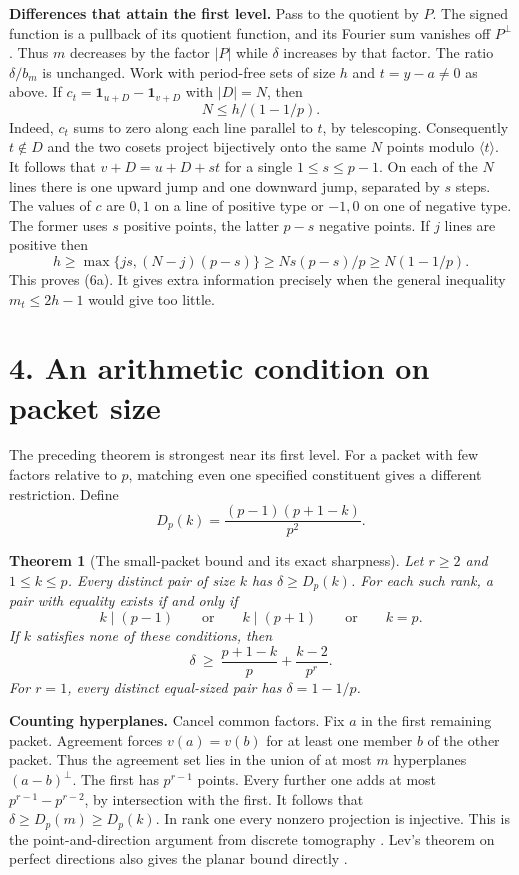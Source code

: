 \documentclass[11pt,letterpaper]{article}
\newcommand{\ind}{\mathbf 1}
\newtheorem{theorem}{Theorem}
\newcommand{\heading}[1]{\section*{\color{ink}#1}}
\newcommand{\subhead}[1]{\par\smallskip\noindent\textbf{#1.}\enspace}
\begin{document}
\subhead{Differences that attain the first level}
Pass to the quotient by $P$. The signed function is a pullback of its quotient function, and its Fourier sum vanishes off $P^\perp$. Thus $m$ decreases by the factor $|P|$ while $\delta$ increases by that factor. The ratio $\delta/b_m$ is unchanged. Work with period-free sets of size $h$ and $t=y-a\ne0$ as above. If $c_t=\ind_{u+D}-\ind_{v+D}$ with $|D|=N$, then
\[
                            N\le h/(1-1/p).                           \tag{6a}
\]
Indeed, $c_t$ sums to zero along each line parallel to $t$, by telescoping. Consequently $t\notin D$ and the two cosets project bijectively onto the same $N$ points modulo $\langle t\rangle$. It follows that $v+D=u+D+st$ for a single $1\le s\le p-1$. On each of the $N$ lines there is one upward jump and one downward jump, separated by $s$ steps. The values of $c$ are $0,1$ on a line of positive type or $-1,0$ on one of negative type. The former uses $s$ positive points, the latter $p-s$ negative points. If $j$ lines are positive then
\[
      h\ge \max\{js,(N-j)(p-s)\}\ge Ns(p-s)/p\ge N(1-1/p).
\]
This proves (6a). It gives extra information precisely when the general inequality $m_t\le2h-1$ would give too little.

\newpage
\heading{4. An arithmetic condition on packet size}
The preceding theorem is strongest near its first level. For a packet with few factors relative to $p$, matching even one specified constituent gives a different restriction. Define
\[
               D_p(k)=\frac{(p-1)(p+1-k)}{p^2}.
\]
\begin{theorem}[The small-packet bound and its exact sharpness]\label{thm:net}
Let $r\ge2$ and $1\le k\le p$. Every distinct pair of size $k$ has $\delta\ge D_p(k)$. For each such rank, a pair with equality exists if and only if
\[
                    k\mid(p-1)\qquad\text{or}\qquad k\mid(p+1)\qquad\text{or}\qquad k=p.
                                                                    \tag{7}
\]
If $k$ satisfies none of these conditions, then
\[
                   \delta\ \ge\ \frac{p+1-k}{p}+\frac{k-2}{p^r}.     \tag{8}
\]
For $r=1$, every distinct equal-sized pair has $\delta=1-1/p$.
\end{theorem}

\subhead{Counting hyperplanes}
Cancel common factors. Fix $a$ in the first remaining packet. Agreement forces $v(a)=v(b)$ for at least one member $b$ of the other packet. Thus the agreement set lies in the union of at most $m$ hyperplanes $(a-b)^\perp$. The first has $p^{r-1}$ points. Every further one adds at most $p^{r-1}-p^{r-2}$, by intersection with the first. It follows that $\delta\ge D_p(m)\ge D_p(k)$. In rank one every nonzero projection is injective. This is the point-and-direction argument from discrete tomography \cite{AL}. Lev's theorem on perfect directions also gives the planar bound directly \cite{Lev}.
\end{document}
